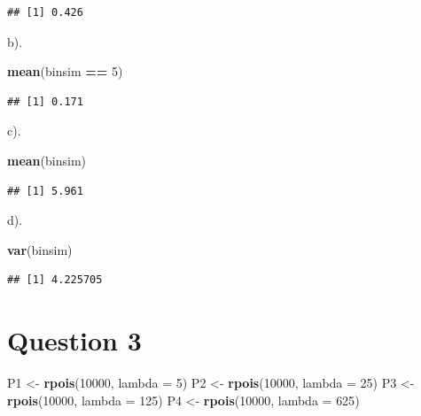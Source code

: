 \documentclass[
]{article}
\newenvironment{Shaded}{\begin{snugshade}}{\end{snugshade}}
\newcommand{\AttributeTok}[1]{\textcolor[rgb]{0.13,0.29,0.53}{#1}}
\newcommand{\DecValTok}[1]{\textcolor[rgb]{0.00,0.00,0.81}{#1}}
\newcommand{\FunctionTok}[1]{\textcolor[rgb]{0.13,0.29,0.53}{\textbf{#1}}}
\newcommand{\NormalTok}[1]{#1}
\newcommand{\OtherTok}[1]{\textcolor[rgb]{0.56,0.35,0.01}{#1}}
\newcommand{\SpecialCharTok}[1]{\textcolor[rgb]{0.81,0.36,0.00}{\textbf{#1}}}
\begin{document}
\begin{verbatim}
## [1] 0.426
\end{verbatim}

b).

\begin{Shaded}
\begin{Highlighting}[]
\FunctionTok{mean}\NormalTok{(binsim }\SpecialCharTok{==} \DecValTok{5}\NormalTok{)}
\end{Highlighting}
\end{Shaded}

\begin{verbatim}
## [1] 0.171
\end{verbatim}

c).

\begin{Shaded}
\begin{Highlighting}[]
\FunctionTok{mean}\NormalTok{(binsim)}
\end{Highlighting}
\end{Shaded}

\begin{verbatim}
## [1] 5.961
\end{verbatim}

d).

\begin{Shaded}
\begin{Highlighting}[]
\FunctionTok{var}\NormalTok{(binsim)}
\end{Highlighting}
\end{Shaded}

\begin{verbatim}
## [1] 4.225705
\end{verbatim}

\section{Question 3}\label{question-3}

\begin{Shaded}
\begin{Highlighting}[]
\NormalTok{P1 }\OtherTok{\textless{}{-}} \FunctionTok{rpois}\NormalTok{(}\DecValTok{10000}\NormalTok{, }\AttributeTok{lambda =} \DecValTok{5}\NormalTok{)}
\NormalTok{P2 }\OtherTok{\textless{}{-}} \FunctionTok{rpois}\NormalTok{(}\DecValTok{10000}\NormalTok{, }\AttributeTok{lambda =} \DecValTok{25}\NormalTok{)}
\NormalTok{P3 }\OtherTok{\textless{}{-}} \FunctionTok{rpois}\NormalTok{(}\DecValTok{10000}\NormalTok{, }\AttributeTok{lambda =} \DecValTok{125}\NormalTok{)}
\NormalTok{P4 }\OtherTok{\textless{}{-}} \FunctionTok{rpois}\NormalTok{(}\DecValTok{10000}\NormalTok{, }\AttributeTok{lambda =} \DecValTok{625}\NormalTok{)}
\end{Highlighting}
\end{Shaded}
\end{document}
